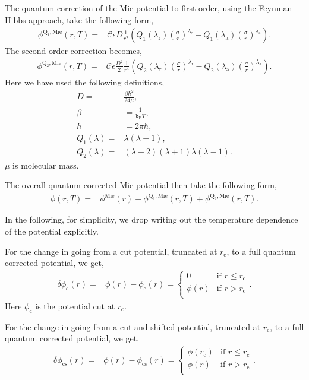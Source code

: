 \documentclass[english]{../thermomemo/thermomemo}
\newcommand*{\lb}{\left(}
\newcommand*{\rb}{\right)}
\newcommand{\mie}{\text{Mie}\xspace}
\newcommand{\lama}{\ensuremath{{\lambda_{\text{a}}}}\xspace}
\newcommand{\lamr}{\ensuremath{{\lambda_{\text{r}}}}\xspace}
\newcommand{\KB}{\ensuremath{\text{k}_{\text{B}}}\xspace}
\newcommand{\cut}{\ensuremath{\text{c}}\xspace}
\newcommand{\cs}{\ensuremath{\text{cs}}\xspace}
\newcommand{\Qone}{\ensuremath{\text{Q}_1}\xspace}
\newcommand{\Qtwo}{\ensuremath{\text{Q}_2}\xspace}
\begin{document}
The quantum correction of the Mie potential to first order, using the
Feynman Hibbs approach, take the following form,
\begin{align}
  \label{eq:Mie_Q1}
  \phi^{\Qone,\mie}\lb r, T\rb =& \mathcal{C}\epsilon D \frac{1}{r^2} \lb Q_{1}\lb \lamr \rb\lb\frac{\sigma}{r}\rb^\lamr - Q_{1}\lb \lama \rb\lb\frac{\sigma}{r}\rb^\lama\rb.
\end{align}
The second order correction becomes,
\begin{align}
  \label{eq:Mie_Q2}
  \phi^{\Qtwo,\mie}\lb r, T\rb =& \mathcal{C}\epsilon \frac{D^2}{2} \frac{1}{r^4} \lb Q_{2}\lb \lamr \rb\lb\frac{\sigma}{r}\rb^\lamr - Q_{2}\lb \lama \rb\lb\frac{\sigma}{r}\rb^\lama  \rb.
\end{align}
Here we have used the following definitions,
\begin{align}
  \label{eq:Mie_Quantum_var}
  D =& \frac{\beta \hbar^2 }{24 \mu},\\
  \beta &= \frac{1}{\KB T},\\
  h &= 2\pi \hbar,\\
  Q_{1}\lb \lambda \rb =& \lambda\lb \lambda - 1 \rb, \\
  Q_{2}\lb \lambda \rb =& \lb \lambda + 2 \rb\lb \lambda + 1\rb\lambda\lb \lambda - 1 \rb.
\end{align}
$\mu$ is molecular mass.

The overall quantum corrected Mie potential then take the following form,
\begin{align}
  \label{eq:Mie_Quantum}
  \phi\lb r, T\rb =& \phi^\mie\lb r\rb + \phi^{\Qone,\mie}\lb r, T\rb + \phi^{\Qtwo,\mie}\lb r, T\rb.
\end{align}

In the following, for simplicity, we drop writing out the temperature
dependence of the potential explicitly.

For the change in going from a cut potential, truncated at $r_\cut$, to
a full quantum corrected potential, we get,
\begin{align}
  \label{eq:dphi}
  \delta \phi_\cut\lb r\rb =& \phi\lb r\rb - \phi_\cut\lb r\rb =
  \begin{cases}
    0 & \text{if } r \leq r_\cut\\
    \phi\lb r\rb & \text{if } r > r_\cut\\
  \end{cases}.
\end{align}
Here $\phi_\cut$ is the potential cut at $r_\cut$.

For the change in going from a cut and shifted potential, truncated at $r_\cut$, to
a full quantum corrected potential, we get,
\begin{align}
  \label{eq:dphi_shift}
  \delta \phi_\cs\lb r\rb =& \phi\lb r\rb - \phi_\cs\lb r\rb =
  \begin{cases}
    \phi\lb r_\cut\rb & \text{if } r \leq r_\cut\\
    \phi\lb r\rb & \text{if } r > r_\cut\\
  \end{cases}.
\end{align}
\end{document}
